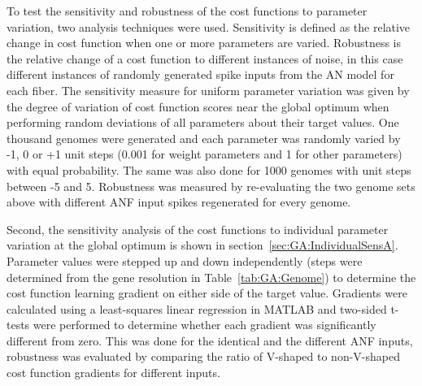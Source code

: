 \medskip{}

To test the sensitivity and robustness of the cost functions to
parameter variation, two analysis techniques were used. Sensitivity is
defined as the relative change in cost function when one or more
parameters are varied.  Robustness is the relative change of a cost
function to different instances of noise, in this case different
instances of randomly generated spike inputs from the AN model for
each fiber.  The sensitivity measure for uniform parameter variation
was given by the degree of variation of cost function scores near the
global optimum when performing random deviations of all parameters
about their target values. One thousand genomes were generated and
each parameter was randomly varied by -1, 0 or +1 unit steps (0.001
for weight parameters and 1 for other parameters) with equal
probability. The same was also done for 1000 genomes with unit steps
between -5 and 5.  Robustness was measured by re-evaluating the two
genome sets above with different ANF input spikes regenerated for
every genome.

\medskip{}

Second, the sensitivity analysis of the cost functions to individual parameter
variation at the global optimum is shown in section~\ref{sec:GA:IndividualSensA}. Parameter values were
stepped up and down independently (steps were determined from the gene
resolution in Table~\ref{tab:GA:Genome}) to determine the cost function
learning gradient on either side of the target value. Gradients were
calculated using a least-squares linear regression in MATLAB and
two-sided t-tests were performed to determine whether each gradient
was significantly different from zero.  This was done for the
identical and the different ANF inputs, robustness was evaluated by
comparing the ratio of V-shaped to non-V-shaped cost function
gradients for different inputs.

\medskip{}


